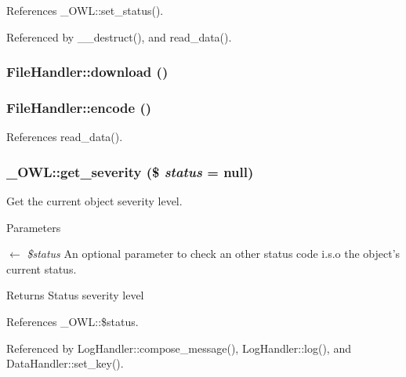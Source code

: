 References \_\-OWL::set\_\-status().



Referenced by \_\-\_\-destruct(), and read\_\-data().

\subsubsection[{download}]{\setlength{\rightskip}{0pt plus 5cm}FileHandler::download ()}\label{classFileHandler_ac17edc9b92643c32ae6040b1235c64dd}
\subsubsection[{encode}]{\setlength{\rightskip}{0pt plus 5cm}FileHandler::encode ()}\label{classFileHandler_aa29360bf94fd54d906256561f33d93ad}


References read\_\-data().

\subsubsection[{get\_\-severity}]{\setlength{\rightskip}{0pt plus 5cm}\_\-OWL::get\_\-severity (\$ {\em status} = {\ttfamily null})}\label{class__OWL_adf9509ef96858be7bdd9414c5ef129aa}
Get the current object severity level.


\begin{DoxyParams}{Parameters}
\item[\mbox{$\leftarrow$} {\em \$status}]An optional parameter to check an other status code i.s.o the object's current status. \end{DoxyParams}
\begin{DoxyReturn}{Returns}
Status severity level 
\end{DoxyReturn}


References \_\-OWL::\$status.



Referenced by LogHandler::compose\_\-message(), LogHandler::log(), and DataHandler::set\_\-key().

